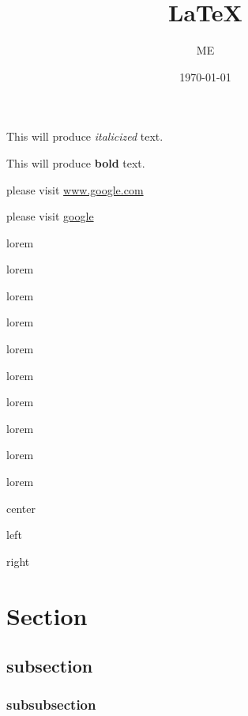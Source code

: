 \documentclass[12pt]{article}
\title{\LaTeX}
\author{ME}
\date{\today}
\begin{document}
\tableofcontents

\maketitle


This will produce \textit{italicized} text.
\vspace{1cm}

This will produce \textbf{bold} text.

\vspace{1cm}

please visit \url{www.google.com}

please visit \href{www.google.com}{google}



\vspace{1cm}


lorem
\begin{large}
lorem
\end{large}
\begin{Large}
lorem
\end{Large}
\begin{LARGE}
lorem
\end{LARGE}
\begin{huge}
lorem
\end{huge}
\begin{Huge}
lorem
\end{Huge}



\vspace{1cm}
\begin{normalsize}
lorem
\end{normalsize}
\begin{small}
lorem
\end{small}
\begin{scriptsize}
lorem
\end{scriptsize}
\begin{tiny}
lorem
\end{tiny}

\vspace{1cm}
\begin{center}
center
\end{center}

\begin{flushleft}
left
\end{flushleft}

\begin{flushright}
right
\end{flushright}






\vspace{1cm}
\section{Section}
	\subsection{subsection}
		\subsubsection{subsubsection}
\end{document}
